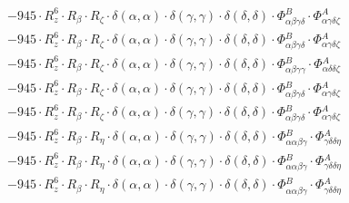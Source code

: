 \documentclass{article}
\begin{document}
\begin{subequations}
\begin{gather}
\begin{array}{c}
 \\[0.2em] 		 - 945 \cdot R_{z}^{6} \cdot R_{\beta{}} \cdot R_{\zeta{}} \cdot \delta{}\left(\alpha{}, \alpha{}\right) \cdot \delta{}\left(\gamma{}, \gamma{}\right) \cdot \delta{}\left(\delta{}, \delta{}\right) \cdot \Phi{}^{B}_{\alpha{}\beta{}\gamma{}\delta{}} \cdot \Phi{}^{A}_{\alpha{}\gamma{}\delta{}\zeta{}} 
 \\[0.2em] 		 - 945 \cdot R_{z}^{6} \cdot R_{\beta{}} \cdot R_{\zeta{}} \cdot \delta{}\left(\alpha{}, \alpha{}\right) \cdot \delta{}\left(\gamma{}, \gamma{}\right) \cdot \delta{}\left(\delta{}, \delta{}\right) \cdot \Phi{}^{B}_{\alpha{}\beta{}\gamma{}\delta{}} \cdot \Phi{}^{A}_{\alpha{}\gamma{}\delta{}\zeta{}} 
 \\[0.2em] 		 - 945 \cdot R_{z}^{6} \cdot R_{\beta{}} \cdot R_{\zeta{}} \cdot \delta{}\left(\alpha{}, \alpha{}\right) \cdot \delta{}\left(\gamma{}, \gamma{}\right) \cdot \delta{}\left(\delta{}, \delta{}\right) \cdot \Phi{}^{B}_{\alpha{}\beta{}\gamma{}\gamma{}} \cdot \Phi{}^{A}_{\alpha{}\delta{}\delta{}\zeta{}} 
 \\[0.2em] 		 - 945 \cdot R_{z}^{6} \cdot R_{\beta{}} \cdot R_{\zeta{}} \cdot \delta{}\left(\alpha{}, \alpha{}\right) \cdot \delta{}\left(\gamma{}, \gamma{}\right) \cdot \delta{}\left(\delta{}, \delta{}\right) \cdot \Phi{}^{B}_{\alpha{}\beta{}\gamma{}\delta{}} \cdot \Phi{}^{A}_{\alpha{}\gamma{}\delta{}\zeta{}} 
 \\[0.2em] 		 - 945 \cdot R_{z}^{6} \cdot R_{\beta{}} \cdot R_{\zeta{}} \cdot \delta{}\left(\alpha{}, \alpha{}\right) \cdot \delta{}\left(\gamma{}, \gamma{}\right) \cdot \delta{}\left(\delta{}, \delta{}\right) \cdot \Phi{}^{B}_{\alpha{}\beta{}\gamma{}\delta{}} \cdot \Phi{}^{A}_{\alpha{}\gamma{}\delta{}\zeta{}} 
 \\[0.2em] 		 - 945 \cdot R_{z}^{6} \cdot R_{\beta{}} \cdot R_{\eta{}} \cdot \delta{}\left(\alpha{}, \alpha{}\right) \cdot \delta{}\left(\gamma{}, \gamma{}\right) \cdot \delta{}\left(\delta{}, \delta{}\right) \cdot \Phi{}^{B}_{\alpha{}\alpha{}\beta{}\gamma{}} \cdot \Phi{}^{A}_{\gamma{}\delta{}\delta{}\eta{}} 
 \\[0.2em] 		 - 945 \cdot R_{z}^{6} \cdot R_{\beta{}} \cdot R_{\eta{}} \cdot \delta{}\left(\alpha{}, \alpha{}\right) \cdot \delta{}\left(\gamma{}, \gamma{}\right) \cdot \delta{}\left(\delta{}, \delta{}\right) \cdot \Phi{}^{B}_{\alpha{}\alpha{}\beta{}\gamma{}} \cdot \Phi{}^{A}_{\gamma{}\delta{}\delta{}\eta{}} 
 \\[0.2em] 		 - 945 \cdot R_{z}^{6} \cdot R_{\beta{}} \cdot R_{\eta{}} \cdot \delta{}\left(\alpha{}, \alpha{}\right) \cdot \delta{}\left(\gamma{}, \gamma{}\right) \cdot \delta{}\left(\delta{}, \delta{}\right) \cdot \Phi{}^{B}_{\alpha{}\alpha{}\beta{}\gamma{}} \cdot \Phi{}^{A}_{\gamma{}\delta{}\delta{}\eta{}} 

\end{array}
\end{gather}
\end{subequations}
\end{document}
